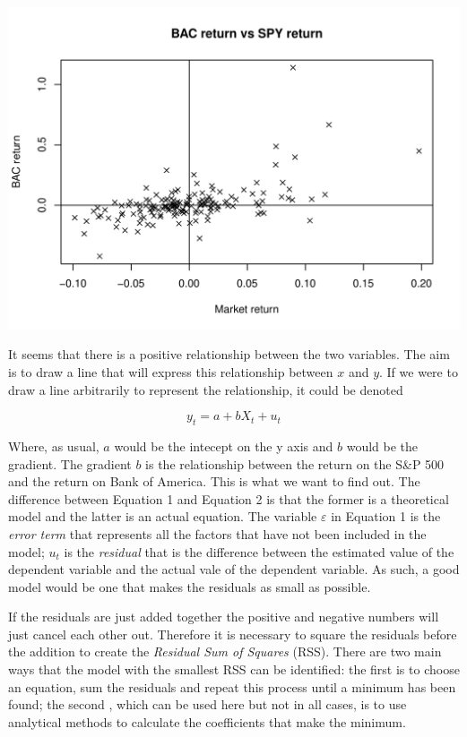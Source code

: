 \documentclass{article}\usepackage[]{graphicx}\usepackage[]{color}
\makeatletter
\def\maxwidth{ %
  \ifdim\Gin@nat@width>\linewidth
    \linewidth
  \else
    \Gin@nat@width
  \fi
}
\newenvironment{knitrout}{}{} %
\makeatother
\begin{document}
\begin{knitrout}
\color{fgcolor}
\includegraphics[width=\maxwidth]{figure/Reg1} 

\end{knitrout}


It seems that there is a positive relationship between the two variables.  The aim is to draw a line that will express this relationship between $x$ and $y$.  If we were to draw a line arbitrarily to represent the relationship, it could be denoted

\begin{equation}
y_t = a + bX_t + u_t
\end{equation}

Where, as usual, $a$ would be the intecept on the y axis and $b$ would be the gradient. The gradient $b$ is the relationship between the return on the S\&P 500 and the return on Bank of America.  This is what we want to find out.  The difference between Equation 1 and Equation 2 is that the former is a theoretical model and the latter is an actual equation.   The variable $\varepsilon$ in Equation 1 is the \emph{error term} that represents all the factors that have not been included in the model; $u_t$ is the \emph{residual}  that is the difference between the estimated value of the dependent variable and the actual vale of the dependent variable.  As such, a good model would be one that makes the residuals as small as possible.

If the residuals are just added together the positive and negative numbers will just cancel each other out.  Therefore it is necessary to square the residuals before the addition to create the \emph{Residual Sum of Squares} (RSS).  There are two main ways that the model with the smallest RSS can be identified: the first is to choose an equation, sum the residuals and repeat this process until a minimum has been found; the second , which can be used here but not in all cases, is to use analytical methods to calculate the coefficients that make the minimum.
\end{document}
